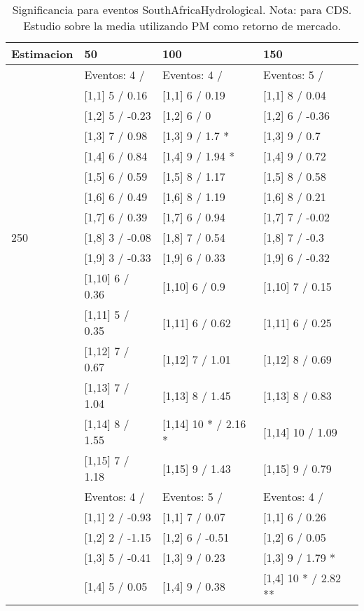 \begin{table}

\caption{Significancia para eventos SouthAfricaHydrological. Nota: para CDS. Estudio sobre la media utilizando PM como retorno de mercado.}
\centering
\begin{tabular}[t]{llll}
\toprule
Estimacion & 50 & 100 & 150\\
\midrule
 & Eventos:  4 / & Eventos:  4 / & Eventos:  5 /\\
 & {}[1,1] 5  / 0.16 & {}[1,1] 6  / 0.19 & {}[1,1] 8  / 0.04\\
 & {}[1,2] 5  / -0.23 & {}[1,2] 6  / 0 & {}[1,2] 6  / -0.36\\
 & {}[1,3] 7  / 0.98 & {}[1,3] 9  / 1.7 * & {}[1,3] 9  / 0.7\\
 & {}[1,4] 6  / 0.84 & {}[1,4] 9  / 1.94 * & {}[1,4] 9  / 0.72\\
\addlinespace
 & {}[1,5] 6  / 0.59 & {}[1,5] 8  / 1.17 & {}[1,5] 8  / 0.58\\
 & {}[1,6] 6  / 0.49 & {}[1,6] 8  / 1.19 & {}[1,6] 8  / 0.21\\
 & {}[1,7] 6  / 0.39 & {}[1,7] 6  / 0.94 & {}[1,7] 7  / -0.02\\
250 & {}[1,8] 3  / -0.08 & {}[1,8] 7  / 0.54 & {}[1,8] 7  / -0.3\\
 & {}[1,9] 3  / -0.33 & {}[1,9] 6  / 0.33 & {}[1,9] 6  / -0.32\\
\addlinespace
 & {}[1,10] 6  / 0.36 & {}[1,10] 6  / 0.9 & {}[1,10] 7  / 0.15\\
 & {}[1,11] 5  / 0.35 & {}[1,11] 6  / 0.62 & {}[1,11] 6  / 0.25\\
 & {}[1,12] 7  / 0.67 & {}[1,12] 7  / 1.01 & {}[1,12] 8  / 0.69\\
 & {}[1,13] 7  / 1.04 & {}[1,13] 8  / 1.45 & {}[1,13] 8  / 0.83\\
 & {}[1,14] 8  / 1.55 & {}[1,14] 10 * / 2.16 * & {}[1,14] 10  / 1.09\\
\addlinespace
 & {}[1,15] 7  / 1.18 & {}[1,15] 9  / 1.43 & {}[1,15] 9  / 0.79\\
 & Eventos:  4 / & Eventos:  5 / & Eventos:  4 /\\
 & {}[1,1] 2  / -0.93 & {}[1,1] 7  / 0.07 & {}[1,1] 6  / 0.26\\
 & {}[1,2] 2  / -1.15 & {}[1,2] 6  / -0.51 & {}[1,2] 6  / 0.05\\
 & {}[1,3] 5  / -0.41 & {}[1,3] 9  / 0.23 & {}[1,3] 9  / 1.79 *\\
\addlinespace
 & {}[1,4] 5  / 0.05 & {}[1,4] 9  / 0.38 & {}[1,4] 10 * / 2.82 **\\

\end{tabular}
\end{table}
